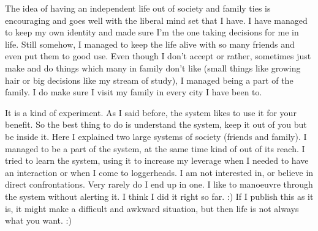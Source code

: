 The idea of having an independent life out of society and family ties is encouraging and goes 
well with the liberal mind set that I have. I have managed to keep my own identity and made sure I'm the 
one taking decisions for me in life. Still somehow, I managed to keep the life alive with so many 
friends and even put them to good use. Even though I don't accept or rather, sometimes just make and do 
things which many in family don't like (small things like growing hair or big decisions like my 
stream of study), I managed being a part of the family. I do make sure I visit my family in every 
city I have been to. 

It is a kind of experiment. As I said before, the system likes to use it for your benefit. So the best 
thing to do is understand the system, keep it out of you but be inside it. Here I explained two 
large systems of society (friends and family). I managed to be a part of the system, at the same time 
kind of out of its reach. I tried to learn the system, using it to increase my leverage when I needed to have 
an interaction or when I come to loggerheads. I am not interested in, or believe in direct
confrontations. Very rarely do I end up in one. I like to manoeuvre through the system without 
alerting it. I think I did it right so far. :) If I publish this as it is, it might make a difficult 
and awkward situation, but then life is not always what you want. :)

\newpage 
